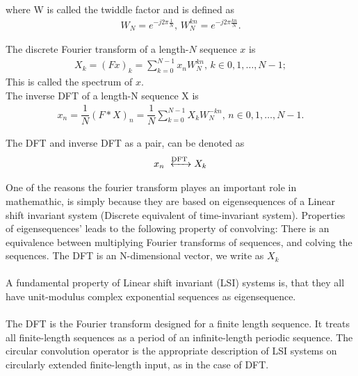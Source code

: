 where W is called the twiddle factor and is defined as \cite{DFT_OX}
\begin{align*}
	W_N = e^{-j 2 \pi\frac{1}{N}}, \, W_N^{kn} = e^{-j 2 \pi\frac{kn}{N}}.
\end{align*}

\begin{definition}
The discrete Fourier transform of a length-$N$ sequence $x$ is 
\begin{align*}
	X_k = (Fx)_k = \sum_{k=0}^{N-1} x_n W_N^{kn}, \, k\in {0, 1, \dots, N-1};
\end{align*}
This is called the spectrum of $x$.\\
The inverse DFT of a length-N sequence X is
\begin{align*}
	x_n = \dfrac{1}{N}(F*X)_n = \dfrac{1}{N}\sum_{k=0}^{N-1} X_k W_N^{-kn}, \, n \in {0, 1, \dots, N-1}.
\end{align*}

The DFT and inverse DFT as a pair, can be denoted as 
\begin{align*}
	x_n \xleftrightarrow{\text{DFT}} X_k
\end{align*}
\end{definition} 
\cite{FSP}

One of the reasons the fourier transform playes an important role in mathemathic, is simply because they are based on eigensequences of a Linear shift invariant system (Discrete equivalent of time-invariant system). 
 Properties of eigensequences' leads to the following property of convolving:
There is an equivalence between multiplying Fourier transforms of sequences, and colving the sequences.
 The DFT is an N-dimensional vector, we write as $X_k$
\\\\
 A fundamental property of Linear shift invariant (LSI) systems is, that they all have unit-modulus complex exponential sequences as eigensequence. \cite{FSP}
\\\\
The DFT is the Fourier transform designed for a finite length sequence.
It treats all finite-length sequences as a period of an infinite-length periodic sequence.
The circular convolution operator is the appropriate description of LSI systems on circularly extended finite-length input, as in the case of DFT.  

